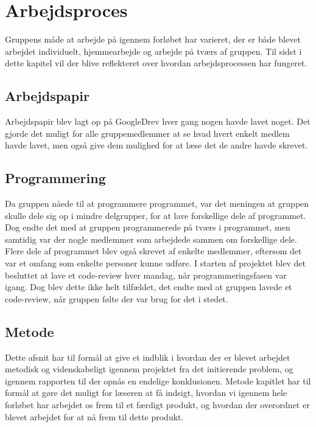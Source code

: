 \chapter{Arbejdsproces}\label{Arbejdsproces}
Gruppens måde at arbejde på igennem forløbet har varieret, der er både blevet arbejdet individuelt, hjemmearbejde og arbejde på tværs af gruppen. Til sidst i dette kapitel vil der blive reflekteret over hvordan arbejdsprocessen har fungeret.


\section{Arbejdspapir}\label{Arbejdspapir}
Arbejdspapir blev lagt op på GoogleDrev hver gang nogen havde lavet noget. Det gjorde det muligt for alle gruppemedlemmer at se hvad hvert enkelt medlem havde lavet, men også give dem mulighed for at læse det de andre havde skrevet.

\section{Programmering}\label{Programmering}

Da gruppen nåede til at programmere programmet, var det meningen at gruppen skulle dele sig op i mindre delgrupper, for at lave forskellige dele af programmet. Dog endte det med at gruppen programmerede på tværs i programmet, men samtidig var der nogle medlemmer som arbejdede sammen om forskellige dele. Flere dele af programmet blev også skrevet af enkelte medlemmer, eftersom det var et omfang som enkelte personer kunne udføre. I starten af projektet blev det besluttet at lave et code-review hver mandag, når programmeringsfasen var igang. Dog blev dette ikke helt tilfældet, det endte med at gruppen lavede et code-review, når gruppen følte der var brug for det i stedet. 


\section{Metode}\label{Metode}

Dette afsnit har til formål at give et indblik i hvordan der er blevet arbejdet metodisk og videnskabeligt igennem projektet fra det initierende problem, og igennem rapporten til der opnås en endelige konklusionen. Metode kapitlet har til formål at gøre det muligt for læseren at få indsigt, hvordan vi igennem hele forløbet har arbejdet os frem til et færdigt produkt, og hvordan der overordnet er blevet arbejdet for at nå frem til dette produkt. 


